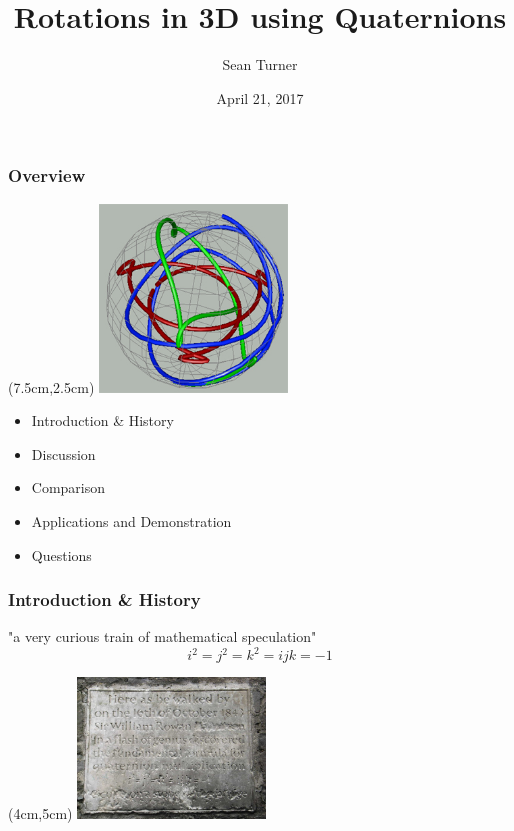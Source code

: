 \documentclass[serif,mathserif]{beamer}
\author[Sean Turner]{Sean Turner}
\title[Quaternions\hspace{2em}\insertframenumber/\inserttotalframenumber]{Rotations in 3D using Quaternions}
\date{April 21, 2017}
\institute{University of Maine, Department of Mathematics and Statistics}
\begin{document}
\maketitle

\begin{frame}
  \frametitle{Overview}
  \begin{textblock*}{2.5cm}(7.5cm,2.5cm) %
  \includegraphics[width=5cm]{Images/quaternion_map.jpg}
  \end{textblock*}
 \begin{itemize}
 
  \item Introduction \& History
  \item Discussion
  \item Comparison
  \item Applications and Demonstration
  \item Questions
  \end{itemize}
\end{frame}


\begin{frame}
  \frametitle{Introduction \& History}
  \centering
  "a very curious train of mathematical speculation"
   $$ i^2 = j^2 = k^2 = ijk = -1 $$
  \begin{textblock*}{2.5cm}(4cm,5cm) %
  \includegraphics[width=5cm]{Images/bridge.jpg}
  \end{textblock*}
  
\end{frame}
\end{document}
